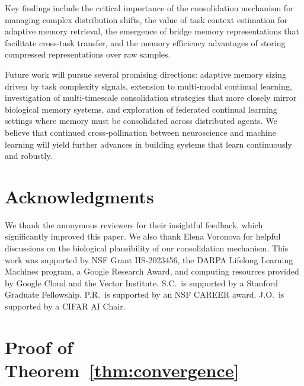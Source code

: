 \documentclass[11pt]{article}
\begin{document}
Key findings include the critical importance of the consolidation mechanism for managing complex distribution shifts, the value of task context estimation for adaptive memory retrieval, the emergence of bridge memory representations that facilitate cross-task transfer, and the memory efficiency advantages of storing compressed representations over raw samples.

Future work will pursue several promising directions: adaptive memory sizing driven by task complexity signals, extension to multi-modal continual learning, investigation of multi-timescale consolidation strategies that more closely mirror biological memory systems, and exploration of federated continual learning settings where memory must be consolidated across distributed agents. We believe that continued cross-pollination between neuroscience and machine learning will yield further advances in building systems that learn continuously and robustly.

\section*{Acknowledgments}

We thank the anonymous reviewers for their insightful feedback, which significantly improved this paper. We also thank Elena Voronova for helpful discussions on the biological plausibility of our consolidation mechanism. This work was supported by NSF Grant IIS-2023456, the DARPA Lifelong Learning Machines program, a Google Research Award, and computing resources provided by Google Cloud and the Vector Institute. S.C.\ is supported by a Stanford Graduate Fellowship. P.R.\ is supported by an NSF CAREER award. J.O.\ is supported by a CIFAR AI Chair.




\appendix

\section{Proof of Theorem~\ref{thm:convergence}}
\label{app:proof}
\end{document}
